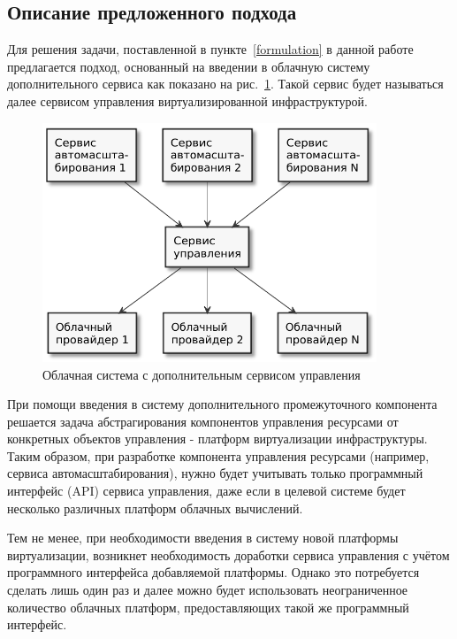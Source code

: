 \subsection{Описание предложенного подхода}
Для решения задачи, поставленной в пункте~\ref{formulation} в данной работе предлагается подход, основанный на введении в облачную систему дополнительного сервиса как показано на рис.~\ref{suggested-approach}.
Такой сервис будет называться далее сервисом управления виртуализированной инфраструктурой.

\begin{figure}[hbtp]
    \centering
    \includegraphics[width=10cm]{img/suggested-approach.pdf}
    \caption{Облачная система с дополнительным сервисом управления}
    \label{suggested-approach}
\end{figure}

При помощи введения в систему дополнительного промежуточного компонента решается задача абстрагирования компонентов управления ресурсами от конкретных объектов управления - платформ виртуализации инфраструктуры. 
Таким образом, при разработке компонента управления ресурсами (например, сервиса автомасштабирования), нужно будет учитывать только программный интерфейс (API) сервиса управления, даже если в целевой системе будет несколько различных платформ облачных вычислений.

Тем не менее, при необходимости введения в систему новой платформы виртуализации, возникнет необходимость доработки сервиса управления с учётом программного интерфейса добавляемой платформы.
Однако это потребуется сделать лишь один раз и далее можно будет использовать неограниченное количество облачных платформ, предоставляющих такой же программный интерфейс.

